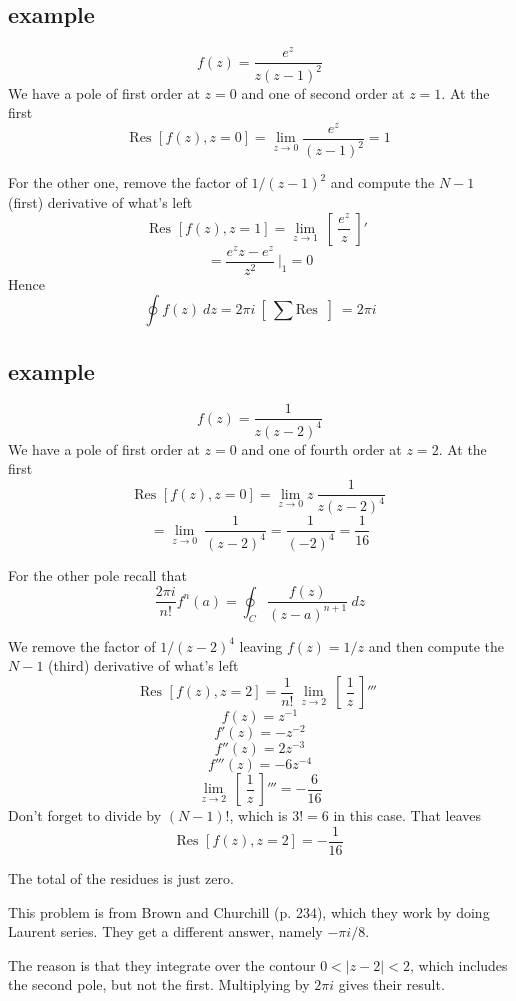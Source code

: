 \documentclass[11pt, oneside]{article}   	%
\begin{document}
\subsection*{example}
\[ f(z) = \frac{e^z}{z(z-1)^2} \]
We have a pole of first order at $z=0$ and one of second order at $z=1$.  At the first
\[ \text{Res } [f(z),z=0] = \lim_{z \rightarrow 0} \frac{e^z}{(z-1)^2} = 1 \]

For the other one, remove the factor of $1/(z-1)^2$ and compute the $N-1$ (first) derivative of what's left
\[ \text{Res } [f(z),z=1] = \lim_{z \rightarrow 1} \ [ \ \frac{e^z}{z} \ ]' \ \]
\[ = \frac{e^z z - e^z}{z^2} \ \bigg |_1 =  0 \]
Hence
\[ \oint f(z) \ dz = 2 \pi i \ [ \ \sum  \text{Res } \ ] \ = 2 \pi i \]

\subsection*{example}
\[ f(z) = \frac{1}{z(z-2)^4} \]
We have a pole of first order at $z=0$ and one of fourth order at $z=2$.  At the first
\[ \text{Res } [f(z),z=0] = \lim_{z \rightarrow 0}  z \ \frac{1}{z(z-2)^4} \]
\[ =  \lim_{z \rightarrow 0} \ \frac{1}{(z-2)^4}  = \frac{1}{(-2)^4} =  \frac{1}{16} \]

For the other pole recall that
\[ \frac{2 \pi i}{n!} f^n(a) = \oint_C \frac{f(z)}{(z-a)^{n+1}} \ dz \]

We remove the factor of $1/(z-2)^4$ leaving $f(z) = 1/z$ and then compute the $N-1$ (third) derivative of what's left
\[ \text{Res } [f(z),z=2] = \frac{1}{n!} \ \lim_{z \rightarrow 2} \ [ \ \frac{1}{z} \ ]''' \ \]
\[ f(z) = z^{-1} \]
\[ f'(z) = - z^{-2} \]
\[ f''(z) = 2 z^{-3} \]
\[ f'''(z) = -6 z^{-4} \]
\[  \lim_{z \rightarrow 2} \ [ \ \frac{1}{z} \ ]''' = - \frac{6}{16} \]
Don't forget to divide by $(N-1)!$, which is $3! = 6$ in this case.  That leaves
\[ \text{Res } [f(z),z=2] = - \frac{1}{16} \]

The total of the residues is just zero.  

This problem is from Brown and Churchill (p. 234), which they work by doing Laurent series.  They get a different answer, namely $-\pi i/8$.  

The reason is that they integrate over the contour $0 < | z - 2 | < 2$, which includes the second pole, but not the first.  Multiplying by $2 \pi i$ gives their result.
\end{document}
